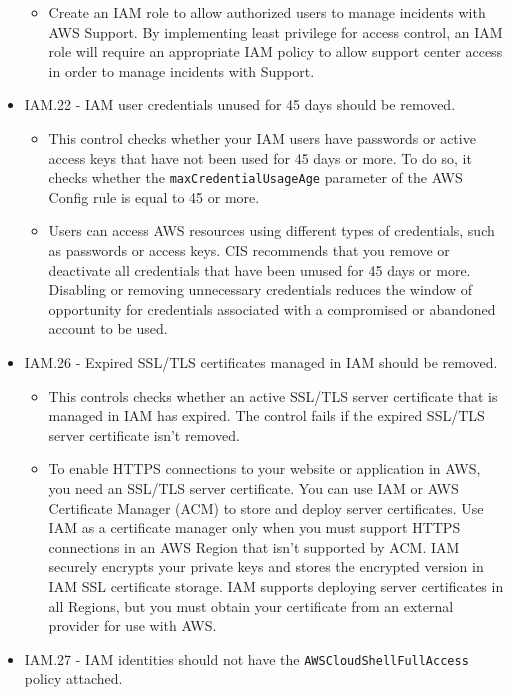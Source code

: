 \begin{mdframed}[backgroundcolor=gray!05, linecolor=gray!50]
\begin{itemize}
\begin{itemize}
        \item Create an IAM role to allow authorized users to manage incidents with AWS Support. By implementing least privilege for access control, an IAM role will require an appropriate IAM policy to allow support center access in order to manage incidents with Support.
    \end{itemize}
    \item IAM.22 - IAM user credentials unused for 45 days should be removed.
    \begin{itemize}
        \item This control checks whether your IAM users have passwords or active access keys that have not been used for 45 days or more. To do so, it checks whether the \texttt{maxCredentialUsageAge} parameter of the AWS Config rule is equal to 45 or more.
        \item Users can access AWS resources using different types of credentials, such as passwords or access keys. CIS recommends that you remove or deactivate all credentials that have been unused for 45 days or more. Disabling or removing unnecessary credentials reduces the window of opportunity for credentials associated with a compromised or abandoned account to be used.
    \end{itemize}
    \item IAM.26 - Expired SSL/TLS certificates managed in IAM should be removed.
    \begin{itemize}
        \item This controls checks whether an active SSL/TLS server certificate that is managed in IAM has expired. The control fails if the expired SSL/TLS server certificate isn't removed.
        \item To enable HTTPS connections to your website or application in AWS, you need an SSL/TLS server certificate. You can use IAM or AWS Certificate Manager (ACM) to store and deploy server certificates. Use IAM as a certificate manager only when you must support HTTPS connections in an AWS Region that isn't supported by ACM. IAM securely encrypts your private keys and stores the encrypted version in IAM SSL certificate storage. IAM supports deploying server certificates in all Regions, but you must obtain your certificate from an external provider for use with AWS. 
    \end{itemize}
    \item IAM.27 -  IAM identities should not have the \texttt{AWSCloudShellFullAccess} policy attached.
    \begin{itemize}

\end{itemize}
\end{itemize}
\end{mdframed}
